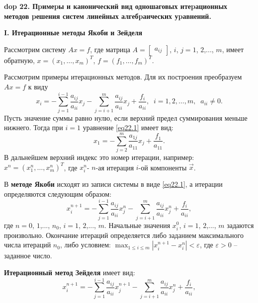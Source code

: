 \textbf{\LARGE dop 22. Пpимеpы и канонический вид одношаговых итеpационных методов pешения систем линейных алгебpаических уpавнений.}
\renewcommand{\theequation}{\arabic{equation}}

\textbf{I. Итерационные методы Якоби и Зейделя}

\par Рассмотрим систему $Ax=f$, где матрица $A=\begin{bmatrix}a_{ij}\end{bmatrix}$, $i$, $j=1$, $2$,..., $m$, имеет обратную, $x=\left( x_{1},\ldots ,x_{m}\right) ^{T}$, $f=\left( f_{1},\ldots ,f_{m}\right) ^{T}$.
\par Рассмотрим примеры итерационных методов. Для их построения преобразуем $Ax=f$ к виду 
\begin{equation} \label{eq22.1}
    x_{i}=-\sum ^{i-1}_{j=1}\dfrac{a_{ij}}{a_{ii}}x_{j}-\sum ^{m}_{j=i+1}\dfrac{a_{ij}}{a_{ii}}x_{j}+\dfrac{f_{i}}{a_{ii}},\;\; i=1, 2,\ldots, m, \;\;a_{ii}\neq 0. 
\end{equation}
Пусть значение суммы равно нулю, если верхний предел суммирования меньше нижнего. Тогда при $i=1$ уравнение \eqref{eq22.1} имеет вид: 
$$x_{1}=-\sum ^{m}_{j=2}\dfrac{a_{1j}}{a_{11}}x_{j}+\dfrac{f_{1}}{a_{11}}.$$ 
В дальнейшем верхний индекс это номер итерации, например: $x^{n}=\left( x_{1}^{n},\ldots ,x_{m}^{n}\right) ^{T}$, где $x_{i}^{n}$- $n$-ая итерация $i$-ой компоненты $\overrightarrow{x}$.\\
\par В \textbf{методе Якоби} исходят из записи системы в виде \eqref{eq22.1}, а итерации определяются следующим образом:
\begin{equation}\label{eq22.5}
   x_{i}^{n+1}=-\sum ^{i-1}_{j=1}\dfrac{a_{ij}}{a_{ii}}x_{j}^{n}-\sum ^{m}_{j=i+1}\dfrac{a_{ij}}{a_{ii}}x_{j}^{n}+\dfrac{f_{i}}{a_{ii}},
\end{equation}
где $n=0$, $1$,..., $n_{0}$, $i=1$, $2$,..., $m$. Начальные значения $x_{i}^{0}$, $i=1$, $2$,..., $m$ задаются произвольно. Окончание итераций определяется либо заданием максимального числа итераций $n_{0}$, либо условием: $\max_{1\leq i\leq m} \left| x_{i}^{n+1}-x_{i}^{n}\right| <\varepsilon$, где $\varepsilon>0$ -- заданное число.\\
\par\textbf{Итерационный метод Зейделя} имеет вид: 
\begin{equation}\label{eq22.2}
    x_{i}^{n+1}=-\sum ^{i-1}_{j=1}\dfrac{a_{ij}}{a_{ii}}x_{j}^{n+1}-\sum ^{m}_{j=i+1}\dfrac{a_{ij}}{a_{ii}}x_{j}^{n}+\dfrac{f_{i}}{a_{ii}},
\end{equation}
